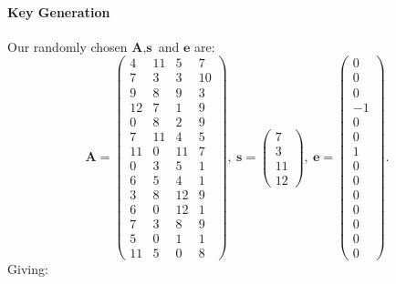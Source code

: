 \documentclass[a4paper, 11pt, openany]{book}
\begin{document}
\paragraph{Key Generation}
Our randomly chosen $\textbf{A},\textbf{s}$ and $\textbf{e}$ are:
$$\textbf{A} = \begin{pmatrix}
4& 11&  5&  7\\
7&  3&  3& 10\\
9&  8&  9&  3\\
12&  7&  1&  9\\
0&  8&  2&  9\\
7& 11&  4&  5\\
11&  0& 11&  7\\
0&  3&  5&  1\\
6&  5&  4&  1\\
3&  8& 12&  9\\
6&  0& 12&  1\\
7&  3&  8&  9\\
5&  0&  1&  1\\
11&  5&  0&  8
\end{pmatrix},~
\textbf{s} = \begin{pmatrix} 7 \\ 3 \\ 11 \\ 12 \end{pmatrix},~
\textbf{e} = \begin{pmatrix}0\\0\\0\\-1\\0\\0\\1\\0\\0\\0\\0\\0\\0\\0\end{pmatrix}.
$$
Giving:
\end{document}
